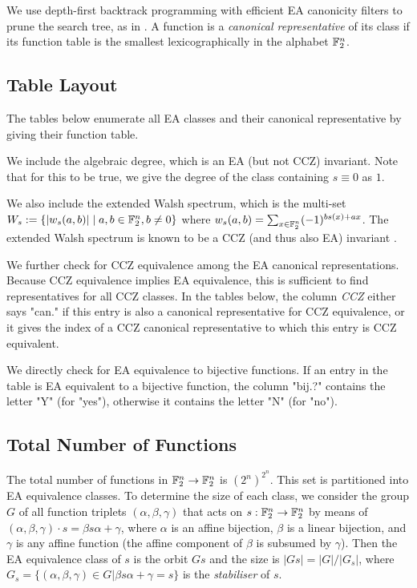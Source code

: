 We use depth-first backtrack programming with efficient EA canonicity filters to prune the search tree, as in \cite{Brinkmann2008}.  A function is a \emph{canonical representative} of its class if its function table is the smallest lexicographically in the alphabet ${\mathbb{F}}_2^n$.

\subsection{Table Layout}

The tables below enumerate all EA classes and their canonical representative by giving their function table.

We include the algebraic degree, which is an EA (but not CCZ) invariant. Note that for this to be true, we give the degree of the class containing $s \equiv 0$ as $1$.

We also include the extended Walsh spectrum, which is the multi-set $W_s := \{|w_s(a,b)| \mid a,b\in{\mathbb{F}}_2^n, b \neq 0\}$ where $w_s(a,b)=\sum_{x\in{\mathbb{F}}_2^n}(-1)^{bs(x)+ax}$. The extended Walsh spectrum is known to be a CCZ (and thus also EA) invariant \cite{Carlet1998}.

We further check for CCZ equivalence among the EA canonical representations.  Because CCZ equivalence implies EA equivalence, this is sufficient to find representatives for all CCZ classes.  In the tables below, the column \emph{CCZ} either says "can." if this entry is also a canonical representative for CCZ equivalence, or it gives the index of a CCZ canonical representative to which this entry is CCZ equivalent.

We directly check for EA equivalence to bijective functions. If an entry in the table is EA equivalent to a bijective function, the column "bij.?" contains the letter "Y" (for "yes"), otherwise it contains the letter "N" (for "no").

\subsection{Total Number of Functions}

The total number of functions in ${\mathbb{F}}_2^n\to{\mathbb{F}}_2^n$ is $({2^n})^{2^n}$. This set is partitioned into EA equivalence classes. To determine the size of each class, we consider the group $G$ of all function triplets $(\alpha, \beta, \gamma)$ that acts on $s:{\mathbb{F}}_2^n\to{\mathbb{F}}_2^n$ by means of $(\alpha, \beta, \gamma)\cdot s = \beta s \alpha + \gamma$, where $\alpha$ is an affine bijection, $\beta$ is a linear bijection, and $\gamma$ is any affine function (the affine component of $\beta$ is subsumed by $\gamma$). Then the EA equivalence class of $s$ is the orbit $Gs$ and the size is $|Gs| = |G|/|G_s|$, where $G_s = \{(\alpha, \beta, \gamma) \in G | \beta s \alpha + \gamma = s\}$ is the \emph{stabiliser} of $s$.

